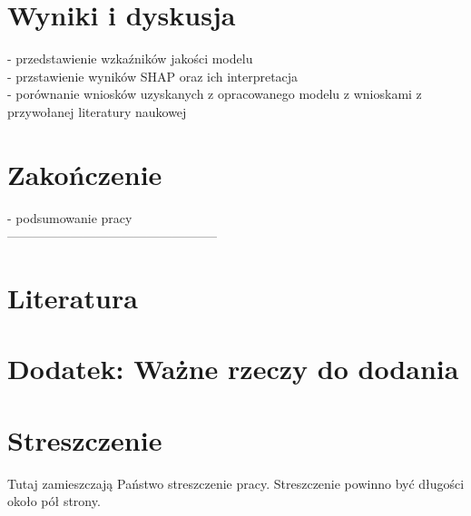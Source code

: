 \documentclass[polish, twoside, 12pt, a4paper]{article}
\theoremstyle{definition}
\theoremstyle{plain}
\theoremstyle{remark}
\begin{document}
\section{Wyniki i dyskusja}

- przedstawienie wzkaźników jakości modelu \\
- przstawienie wyników SHAP oraz ich interpretacja \\
- porównanie wniosków uzyskanych z opracowanego modelu z wnioskami z przywołanej literatury naukowej \\ 

\clearpage
\section{Zakończenie}


- podsumowanie pracy \\


--------------------------------------------------
\clearpage
\section{Literatura}



\appendix

\clearpage
\section{Dodatek: Ważne rzeczy do dodania}




\clearpage



\clearpage
{}
\listoftables

\clearpage
{}
\listoffigures



\clearpage
{}
\section*{Streszczenie}

Tutaj zamieszczają Państwo streszczenie pracy. Streszczenie powinno być długości około pół strony.
\end{document}

